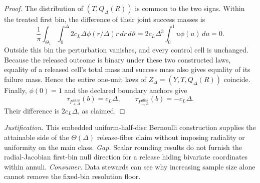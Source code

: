 \documentclass{article}
\begin{document}
\begin{proof}
The distribution of \((T,Q_\Delta(R))\) is common to the two signs.  Within the treated first bin, the difference of their joint success masses is
\[
 \frac1\pi\int_{\Theta_1}\int_0^\Delta
 2c_L\Delta\phi(r/\Delta)r\,dr\,d\vartheta
 =2c_L\Delta^3\int_0^1u\phi(u)\,du=0.
\]
Outside this bin the perturbation vanishes, and every control cell is unchanged.  Because the released outcome is binary under these two constructed laws, equality of a released cell's total mass and success mass also gives equality of its failure mass.  Hence the entire one-unit laws of \(Z_\Delta=(Y,T,Q_\Delta(R))\) coincide.  Finally, \(\phi(0)=1\) and the declared boundary anchors give
\[
 \tau_{P^{\mathrm{alias}}_{+,\Delta}}(b)=c_L\Delta,
 \qquad
 \tau_{P^{\mathrm{alias}}_{-,\Delta}}(b)=-c_L\Delta.
\]
Their difference is \(2c_L\Delta\), as claimed.
\end{proof}
\par\smallskip\noindent \textit{Justification.} This embedded uniform-half-disc Bernoulli construction supplies the attainable side of the \(\Theta(\Delta)\) release-fiber claim without imposing radiality or uniformity on the main class. \textit{Gap.} Scalar rounding results do not furnish the radial-Jacobian first-bin null direction for a release hiding bivariate coordinates within annuli. \textit{Consumer.} Data stewards can see why increasing sample size alone cannot remove the fixed-bin resolution floor.
\end{document}
